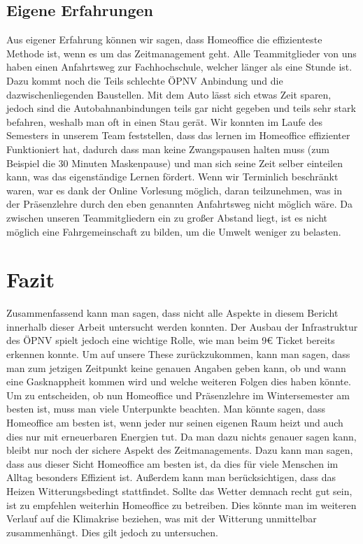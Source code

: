 \documentclass[a4paper,12pt]{scrartcl}
\begin{document}
\subsection{Eigene Erfahrungen}
Aus eigener Erfahrung können wir sagen, dass Homeoffice die effizienteste Methode ist, wenn es um das Zeitmanagement geht. Alle Teammitglieder von uns haben einen Anfahrtsweg zur Fachhochschule, welcher länger als eine Stunde ist. Dazu kommt noch die Teils schlechte ÖPNV Anbindung und die dazwischenliegenden Baustellen. Mit dem Auto lässt sich etwas Zeit sparen, jedoch sind die Autobahnanbindungen teils gar nicht gegeben und teils sehr stark befahren, weshalb man oft in einen Stau gerät. Wir konnten im Laufe des Semesters in unserem Team feststellen, dass das lernen im Homeoffice effizienter Funktioniert hat, dadurch dass man keine Zwangspausen halten muss (zum Beispiel die 30 Minuten Maskenpause) und man sich seine Zeit selber einteilen kann, was das eigenständige Lernen fördert. Wenn wir Terminlich beschränkt waren, war es dank der Online Vorlesung möglich, daran teilzunehmen, was in der Präsenzlehre durch den eben genannten Anfahrtsweg nicht möglich wäre. Da zwischen unseren Teammitgliedern ein zu großer Abstand liegt, ist es nicht möglich eine Fahrgemeinschaft zu bilden, um die Umwelt weniger zu belasten.

\section{Fazit}
Zusammenfassend kann man sagen, dass nicht alle Aspekte in diesem Bericht innerhalb dieser Arbeit untersucht werden konnten. Der Ausbau der Infrastruktur des ÖPNV spielt jedoch eine wichtige Rolle, wie man beim 9€ Ticket bereits erkennen konnte. Um auf unsere These zurückzukommen, kann man sagen, dass man zum jetzigen Zeitpunkt keine genauen Angaben geben kann, ob und wann eine Gasknappheit kommen wird und welche weiteren Folgen dies haben könnte. Um zu entscheiden, ob nun Homeoffice und Präsenzlehre im Wintersemester am besten ist, muss man viele Unterpunkte beachten. Man könnte sagen, dass Homeoffice am besten ist, wenn jeder nur seinen eigenen Raum heizt und auch dies nur mit erneuerbaren Energien tut. Da man dazu nichts genauer sagen kann, bleibt nur noch der sichere Aspekt des Zeitmanagements. Dazu kann man sagen, dass aus dieser Sicht Homeoffice am besten ist, da dies für viele Menschen im Alltag besonders Effizient ist. Außerdem kann man berücksichtigen, dass das Heizen Witterungsbedingt stattfindet. Sollte das Wetter demnach recht gut sein, ist zu empfehlen weiterhin Homeoffice zu betreiben. Dies könnte man im weiteren Verlauf auf die Klimakrise beziehen, was mit der Witterung unmittelbar zusammenhängt. Dies gilt jedoch zu untersuchen.
\end{document}

